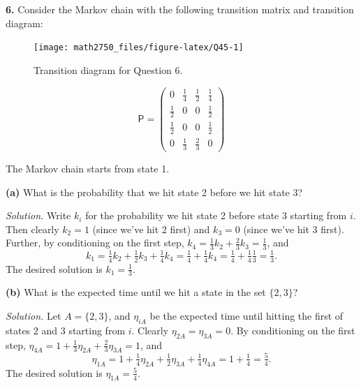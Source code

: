 \documentclass[
  a4paper,
]{article}
\theoremstyle{definition}
\theoremstyle{definition}
\theoremstyle{definition}
\theoremstyle{remark}
\begin{document}
\textbf{6.} Consider the Markov chain with the following transition matrix and transition diagram:

\begin{figure}

{\centering \texttt{[image: math2750\_files/figure-latex/Q45-1]} 

}

\caption{Transition diagram for Question 6.}\label{fig:Q45}
\end{figure}

\[ \mathsf P = \begin{pmatrix} 0 & \frac14 & \frac12 & \frac14 \\
               \frac12 & 0& 0& \frac12 \\
               \frac12 & 0& 0& \frac12 \\
               0 & \frac13 & \frac23 & 0 \end{pmatrix} \]

The Markov chain starts from state 1.

\textbf{(a)} What is the probability that we hit state 2 before we hit state 3?

\begin{myanswers}
\emph{Solution.} Write \(k_i\) for the probability we hit state 2 before state 3 starting from \(i\). Then clearly \(k_2 = 1\) (since we've hit 2 first) and \(k_3 = 0\) (since we've hit 3 first). Further, by conditioning on the first step, \(k_4 = \frac13 k_2 + \frac23 k_3 = \frac13\), and
\[ k_1 = \tfrac14 k_2 + \tfrac12k_3 + \tfrac14 k_4   = \tfrac14 + \tfrac14 k_4 = \tfrac14 + \tfrac14\tfrac13 = \tfrac13 . \]
The desired solution is \(k_1 = \frac13\).

\end{myanswers}

\textbf{(b)} What is the expected time until we hit a state in the set \(\{2,3\}\)?

\begin{myanswers}
\emph{Solution.} Let \(A = \{2,3\}\), and \(\eta_{iA}\) be the expected time until hitting the first of states \(2\) and \(3\) starting from \(i\). Clearly \(\eta_{2A} = \eta_{3A} = 0\). By conditioning on the first step, \(\eta_{4A} = 1+ \frac13 \eta_{2A} + \frac23 \eta_{3A} = 1\), and
\[ \eta_{1A} = 1 + \tfrac14 \eta_{2A} + \tfrac12\eta_{3A} + \tfrac14 \eta_{4A} = 1 + \tfrac14 = \tfrac54 .        \]
The desired solution is \(\eta_{1A} = \tfrac54\).

\end{myanswers}
\end{document}
